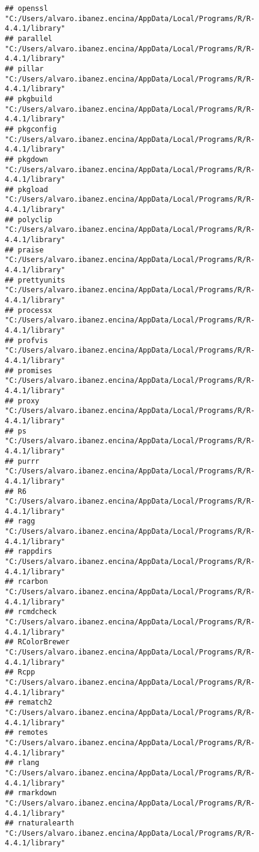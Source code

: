 \documentclass[
]{article}
\begin{document}
\begin{verbatim}
## openssl            "C:/Users/alvaro.ibanez.encina/AppData/Local/Programs/R/R-4.4.1/library"
## parallel           "C:/Users/alvaro.ibanez.encina/AppData/Local/Programs/R/R-4.4.1/library"
## pillar             "C:/Users/alvaro.ibanez.encina/AppData/Local/Programs/R/R-4.4.1/library"
## pkgbuild           "C:/Users/alvaro.ibanez.encina/AppData/Local/Programs/R/R-4.4.1/library"
## pkgconfig          "C:/Users/alvaro.ibanez.encina/AppData/Local/Programs/R/R-4.4.1/library"
## pkgdown            "C:/Users/alvaro.ibanez.encina/AppData/Local/Programs/R/R-4.4.1/library"
## pkgload            "C:/Users/alvaro.ibanez.encina/AppData/Local/Programs/R/R-4.4.1/library"
## polyclip           "C:/Users/alvaro.ibanez.encina/AppData/Local/Programs/R/R-4.4.1/library"
## praise             "C:/Users/alvaro.ibanez.encina/AppData/Local/Programs/R/R-4.4.1/library"
## prettyunits        "C:/Users/alvaro.ibanez.encina/AppData/Local/Programs/R/R-4.4.1/library"
## processx           "C:/Users/alvaro.ibanez.encina/AppData/Local/Programs/R/R-4.4.1/library"
## profvis            "C:/Users/alvaro.ibanez.encina/AppData/Local/Programs/R/R-4.4.1/library"
## promises           "C:/Users/alvaro.ibanez.encina/AppData/Local/Programs/R/R-4.4.1/library"
## proxy              "C:/Users/alvaro.ibanez.encina/AppData/Local/Programs/R/R-4.4.1/library"
## ps                 "C:/Users/alvaro.ibanez.encina/AppData/Local/Programs/R/R-4.4.1/library"
## purrr              "C:/Users/alvaro.ibanez.encina/AppData/Local/Programs/R/R-4.4.1/library"
## R6                 "C:/Users/alvaro.ibanez.encina/AppData/Local/Programs/R/R-4.4.1/library"
## ragg               "C:/Users/alvaro.ibanez.encina/AppData/Local/Programs/R/R-4.4.1/library"
## rappdirs           "C:/Users/alvaro.ibanez.encina/AppData/Local/Programs/R/R-4.4.1/library"
## rcarbon            "C:/Users/alvaro.ibanez.encina/AppData/Local/Programs/R/R-4.4.1/library"
## rcmdcheck          "C:/Users/alvaro.ibanez.encina/AppData/Local/Programs/R/R-4.4.1/library"
## RColorBrewer       "C:/Users/alvaro.ibanez.encina/AppData/Local/Programs/R/R-4.4.1/library"
## Rcpp               "C:/Users/alvaro.ibanez.encina/AppData/Local/Programs/R/R-4.4.1/library"
## rematch2           "C:/Users/alvaro.ibanez.encina/AppData/Local/Programs/R/R-4.4.1/library"
## remotes            "C:/Users/alvaro.ibanez.encina/AppData/Local/Programs/R/R-4.4.1/library"
## rlang              "C:/Users/alvaro.ibanez.encina/AppData/Local/Programs/R/R-4.4.1/library"
## rmarkdown          "C:/Users/alvaro.ibanez.encina/AppData/Local/Programs/R/R-4.4.1/library"
## rnaturalearth      "C:/Users/alvaro.ibanez.encina/AppData/Local/Programs/R/R-4.4.1/library"

\end{verbatim}
\end{document}
